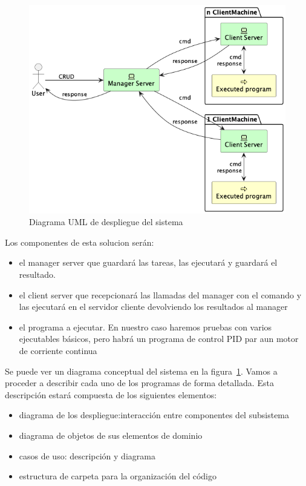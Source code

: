 
\begin{figure}[H]
    \centering
    \includegraphics[height=0.4\textheight]{./part/Proyecto_ejecutivo/memoria_descriptiva/descripcionDelProyecto/manager/uml/systemConcept}
    \caption{Diagrama UML de despliegue del sistema}\label{fig:Diagrama UML de despliegue del sistema}
\end{figure}

Los componentes de esta solucion serán:
\begin{itemize}
    \item el manager server que guardará las tareas, las ejecutará y guardará el resultado.
    \item el client server que recepcionará las llamadas del manager con el comando y las ejecutará en el servidor cliente devolviendo los resultados al manager
    \item el programa a ejecutar. En nuestro caso haremos pruebas con varios ejecutables básicos, pero habrá un programa de control PID par aun motor de corriente continua
\end{itemize}

Se puede ver un diagrama conceptual del sistema en la figura~\ref{fig:Diagrama UML de despliegue del sistema}. Vamos a proceder a describir cada uno de los programas de forma detallada. Esta descripción estará compuesta de los siguientes elementos:

\begin{itemize}
    \item diagrama de los despliegue:interacción entre componentes del subsistema
    \item diagrama de objetos de sus elementos de dominio
    \item casos de uso: descripción y diagrama
    \item estructura de carpeta para la organización del código
\end{itemize}

